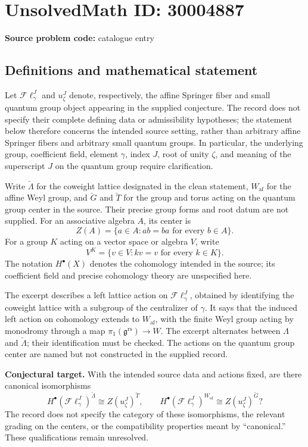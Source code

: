 \documentclass[11pt]{article}
\begin{document}
\section*{UnsolvedMath ID: 30004887}
\textbf{Source problem code:} catalogue entry
\subsection{Definitions and mathematical statement}
Let \(\mathcal F\ell^J_\gamma\) and \(u^J_\zeta\) denote, respectively, the affine Springer fiber and small quantum group object appearing in the supplied conjecture. The record does not specify their complete defining data or admissibility hypotheses; the statement below therefore concerns the intended source setting, rather than arbitrary affine Springer fibers and arbitrary small quantum groups. In particular, the underlying group, coefficient field, element \(\gamma\), index \(J\), root of unity \(\zeta\), and meaning of the superscript \(J\) on the quantum group require clarification.

Write \(\check\Lambda\) for the coweight lattice designated in the clean statement, \(W_{\mathrm{af}}\) for the affine Weyl group, and \(\check G\) and \(\check T\) for the group and torus acting on the quantum group center in the source. Their precise group forms and root datum are not supplied. For an associative algebra \(A\), its center is
\[
Z(A)=\{a\in A:ab=ba\text{ for every }b\in A\}.
\]
For a group \(K\) acting on a vector space or algebra \(V\), write
\[
V^K=\{v\in V:kv=v\text{ for every }k\in K\}.
\]
The notation \(H^\bullet(X)\) denotes the cohomology intended in the source; its coefficient field and precise cohomology theory are unspecified here.

The excerpt describes a left lattice action on \(\mathcal F\ell^J_\gamma\), obtained by identifying the coweight lattice with a subgroup of the centralizer of \(\gamma\). It says that the induced left action on cohomology extends to \(W_{\mathrm{af}}\), with the finite Weyl group acting by monodromy through a map \(\pi_1(\mathfrak g^{\mathrm{rs}})\to W\). The excerpt alternates between \(\Lambda\) and \(\check\Lambda\); their identification must be checked. The actions on the quantum group center are named but not constructed in the supplied record.

\textbf{Conjectural target.} With the intended source data and actions fixed, are there canonical isomorphisms
\[
H^\bullet(\mathcal F\ell^J_\gamma)^{\check\Lambda}
\cong Z(u^J_\zeta)^{\check T},
\qquad
H^\bullet(\mathcal F\ell^J_\gamma)^{W_{\mathrm{af}}}
\cong Z(u^J_\zeta)^{\check G}?
\]
The record does not specify the category of these isomorphisms, the relevant grading on the centers, or the compatibility properties meant by ``canonical.'' These qualifications remain unresolved.
\end{document}
